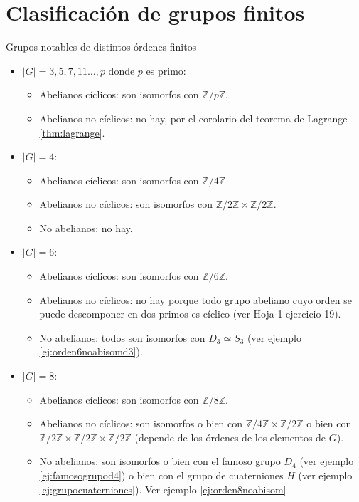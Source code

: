 \documentclass{book}
\theoremstyle{definition}
\theoremstyle{remark}
\newcommand{\isom}{\simeq}
\newcommand{\Z}{\mathbb{Z}}
\begin{document}
\section{Clasificación de grupos finitos}
\label{gruposfinitosnotables}
Grupos notables de distintos órdenes finitos
\begin{itemize}
	\item $|G| = 3, 5, 7, 11 \dots, p$ donde $p$ es primo:
	\begin{itemize}
		\item Abelianos cíclicos: son isomorfos con $\Z/p\Z$.
		\item Abelianos no cíclicos: no hay, por el corolario del teorema de Lagrange \ref{thm:lagrange}.
	\end{itemize}
	\item $|G| = 4$:
	\begin{itemize}
		\item Abelianos cíclicos: son isomorfos con $\Z/4\Z$
		\item Abelianos no cíclicos: son isomorfos con $\Z/2\Z \times \Z/2\Z$.
		\item No abelianos: no hay.
	\end{itemize}
	\item $|G| = 6$:
	\begin{itemize}
		\item Abelianos cíclicos: son isomorfos con $\Z/6\Z$.
		\item Abelianos no cíclicos: no hay porque todo grupo abeliano cuyo orden se puede descomponer en dos primos es cíclico (ver Hoja 1 ejercicio 19).
		\item No abelianos: todos son isomorfos con $D_3 \isom S_3$ (ver ejemplo \ref{ej:orden6noabisomd3}).
	\end{itemize}
	\item $|G| = 8$:
	\begin{itemize}
		\item Abelianos cíclicos: son isomorfos con $\Z/8\Z$.
		\item Abelianos no cíclicos: son isomorfos o bien con $\Z/4\Z \times \Z/2\Z$ o bien con $\Z/2\Z \times \Z/2\Z \times \Z/2\Z$ (depende de los órdenes de los elementos de $G$).
		\item No abelianos: son isomorfos o bien con el famoso grupo $D_4$ (ver ejemplo \ref{ej:famosogrupod4}) o bien con el grupo de cuaterniones $H$ (ver ejemplo \ref{ej:grupocuaterniones}). Ver ejemplo \ref{ej:orden8noabisom}
	\end{itemize}
\end{itemize}
\end{document}
